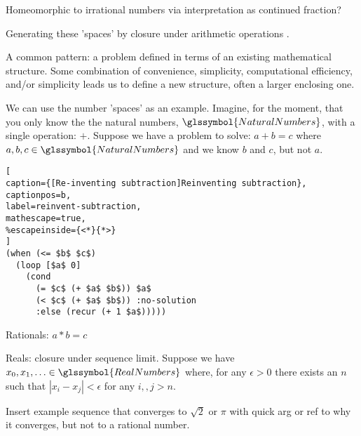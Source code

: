 Homeomorphic to irrational numbers
via interpretation as 
continued 
fraction?\cite{wiki:Baire_space_set_theory,
wiki:Baire_category_theorem,wiki:Baire_space}


Generating these 'spaces' by closure under arithmetic operations
\cite{pickert-gorke-real-numbers-1974}.

A common pattern: a problem defined in terms of an existing mathematical
structure. Some combination of convenience, simplicity, computational
efficiency, and/or simplicity leads us to define a new structure, 
often a larger enclosing one.

We can use the number 'spaces' as an example.
Imagine, for the moment, that you only know the 
the natural numbers, $\glssymbol{NaturalNumbers}$, with a single operation: $+$.
Suppose we have a problem to solve:
\begin{math}
a + b = c
\end{math}
where $a,b,c\in \glssymbol{NaturalNumbers}$ and we know $b$ and $c$,
but not $a$.

\begin{lstlisting}[
caption={[Re-inventing subtraction]Reinventing subtraction},
captionpos=b,
label=reinvent-subtraction,
mathescape=true,
%escapeinside={<*}{*>}
] 
(when (<= $b$ $c$)
  (loop [$a$ 0]
    (cond 
      (= $c$ (+ $a$ $b$)) $a$
      (< $c$ (+ $a$ $b$)) :no-solution
      :else (recur (+ 1 $a$)))))
\end{lstlisting}

Rationals: 
\begin{math}
a * b = c
\end{math}

Reals: closure under sequence limit.
Suppose we have $x_0, x_1, \ldots \in \glssymbol{RealNumbers}$
where, for any $\epsilon>0$ there exists an $n$ such that
$|x_i - x_j| < \epsilon$ for any $i,, j > n$.

Insert example sequence that converges to $\sqrt{2}$ or $\pi$
with quick arg or ref to why it converges, but not to a rational
number.


